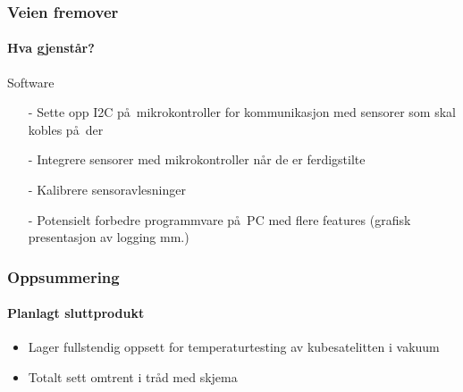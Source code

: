 \documentclass{beamer}
\begin{document}
    \begin{frame}
    \frametitle{Veien fremover}
    \framesubtitle{Hva gjenst\aa r?}
    \begin{block}{Software}
    	\begin{itemize}
    	\item[-] Sette opp I2C p\aa\ mikrokontroller for kommunikasjon med sensorer som skal kobles p\aa\ der
    	\item[-] Integrere sensorer med mikrokontroller n\aa r de er ferdigstilte
    	\item[-] Kalibrere sensoravlesninger
    	\item[-] Potensielt forbedre programmvare p\aa\ PC med flere features (grafisk presentasjon av logging mm.)
    	\end{itemize}
    \end{block}
  \end{frame}
  \begin{frame}
    \frametitle{Oppsummering}
    \framesubtitle{Planlagt sluttprodukt}
    \begin{itemize}
    	\item Lager fullstendig oppsett for temperaturtesting av kubesatelitten i vakuum
    	\item Totalt sett omtrent i tr\aa d med skjema
    \end{itemize}
  \end{frame}
\end{document}
